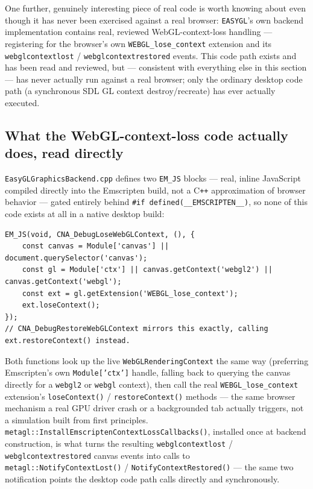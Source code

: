 One further, genuinely interesting piece of real code is worth knowing about even though it
has never been exercised against a real browser: \texttt{EASYGL}'s own backend implementation
contains real, reviewed WebGL-context-loss handling --- registering for the browser's own
\texttt{WEBGL\_lose\_context} extension and its \texttt{webglcontextlost} /
\texttt{webglcontextrestored} events. This code path exists and has been read and reviewed,
but --- consistent with everything else in this section --- has never actually run against a
real browser; only the ordinary desktop code path (a synchronous SDL GL context
destroy/recreate) has ever actually executed.

\subsection{What the WebGL-context-loss code actually does, read directly}

\texttt{EasyGLGraphicsBackend.cpp} defines two \texttt{EM\_JS} blocks --- real, inline
JavaScript compiled directly into the Emscripten build, not a C\texttt{++} approximation of
browser behavior --- gated entirely behind \texttt{\#if defined(\_\_EMSCRIPTEN\_\_)}, so none
of this code exists at all in a native desktop build:

\begin{lstlisting}
EM_JS(void, CNA_DebugLoseWebGLContext, (), {
    const canvas = Module['canvas'] || document.querySelector('canvas');
    const gl = Module['ctx'] || canvas.getContext('webgl2') || canvas.getContext('webgl');
    const ext = gl.getExtension('WEBGL_lose_context');
    ext.loseContext();
});
// CNA_DebugRestoreWebGLContext mirrors this exactly, calling ext.restoreContext() instead.
\end{lstlisting}

Both functions look up the live \texttt{WebGLRenderingContext} the same way (preferring
Emscripten's own \texttt{Module['ctx']} handle, falling back to querying the canvas directly
for a \texttt{webgl2} or \texttt{webgl} context), then call the real
\texttt{WEBGL\_lose\_context} extension's \texttt{loseContext()} / \texttt{restoreContext()}
methods --- the same browser mechanism a real GPU driver crash or a backgrounded tab actually
triggers, not a simulation built from first principles. \texttt{metagl::\allowbreak{}Install\allowbreak{}Emscripten\allowbreak{}ContextLossCallbacks()},
installed once at backend construction, is what turns the resulting
\texttt{webglcontextlost} / \texttt{webglcontextrestored} canvas events into calls to
\texttt{metagl::NotifyContextLost()} / \texttt{NotifyContextRestored()} --- the same two
notification points the desktop code path calls directly and synchronously.

